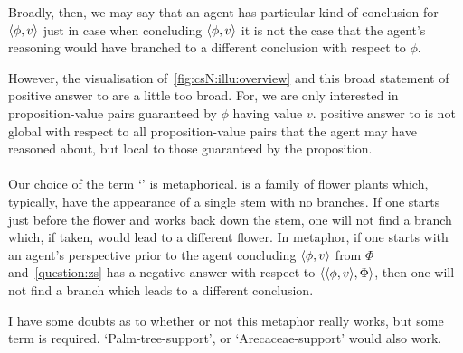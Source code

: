 \begin{note}
  Broadly, then, we may say that an agent has {\color{red} particular kind of conclusion} for \(\langle \phi, v \rangle\) just in case when concluding \(\langle \phi, v \rangle\) it is not the case that the agent's reasoning would have branched to a different conclusion with respect to \(\phi\).

  However, the visualisation of~\autoref{fig:csN:illu:overview} and this broad statement of {\color{red} positive answer to \qzS{}} are a little too broad.
  For, we are only interested in proposition-value pairs guaranteed by \(\phi\) having value \(v\).
  {\color{red} positive answer to \qzS{}} is not global with respect to all proposition-value pairs that the agent may have reasoned about, but local to those guaranteed by the proposition.
\end{note}

\paragraph{}

\begin{note}[Naming]
  Our choice of the term `' is metaphorical.
   is a family of flower plants which, typically, have the appearance of a single stem with no branches.
  If one starts just before the flower and works back down the stem, one will not find a branch which, if taken, would lead to a different flower.
  In metaphor, if one starts with an agent's perspective prior to the agent concluding \(\langle \phi, v \rangle\) from \(\Phi\) and~\autoref{question:zs} has a negative answer with respect to \(\langle \langle \phi, v \rangle, \Phi \rangle\), then one will not find a branch which leads to a different conclusion.

  I have some doubts as to whether or not this metaphor really works, but some term is required.
  `Palm-tree-support', or `Arecaceae-support' would also work.
\end{note}

